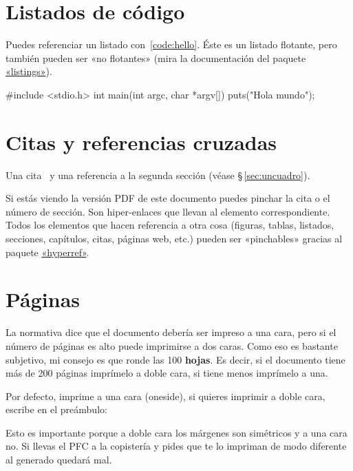 \section{Listados de código}
\label{sec:listado}

Puedes referenciar un listado con~\ref{code:hello}. Éste es un listado flotante,
pero también pueden ser «no flotantes» (mira la documentación del paquete
\href{http://www.ctan.org/get/macros/latex/contrib/listings/listings.pdf}{«listings»}).

\begin{listing}[
  float,
  language = C,
  caption  = {«Hola mundo» en C},
  label    = code:hello]
#include <stdio.h>
int main(int argc, char *argv[]) {
    puts("Hola mundo\n");
}
\end{listing}




\section{Citas y referencias cruzadas}

Una cita~\cite{design_patterns} y una referencia a la segunda sección (véase
\S\,\ref{sec:uncuadro}).

Si estás viendo la versión PDF de este documento puedes pinchar la cita o el
número de sección. Son hiper-enlaces que llevan al elemento correspondiente. Todos los
elementos que hacen referencia a otra cosa (figuras, tablas, listados,
secciones, capítulos, citas, páginas web, etc.) pueden ser «pinchables» gracias al
paquete \href{http://latex.tugraz.at/_media/docs/hyperref.pdf}{«hyperref»}.


\section{Páginas}
\label{sec:paginas}

La normativa dice que el documento debería ser impreso a una cara, pero si el
número de páginas es alto puede imprimirse a dos caras. Como eso es bastante
subjetivo, mi consejo es que ronde las 100 \textbf{hojas}. Es decir, si el
documento tiene más de 200 páginas imprímelo a doble cara, si tiene menos
imprímelo a una.

Por defecto, \arcopfc imprime a una cara (oneside), si quieres imprimir a doble cara,
escribe en el preámbulo:


Esto es importante porque a doble cara los márgenes son simétricos y a una cara
no. Si llevas el PFC a la copistería y pides que te lo impriman de modo
diferente al generado quedará mal.


